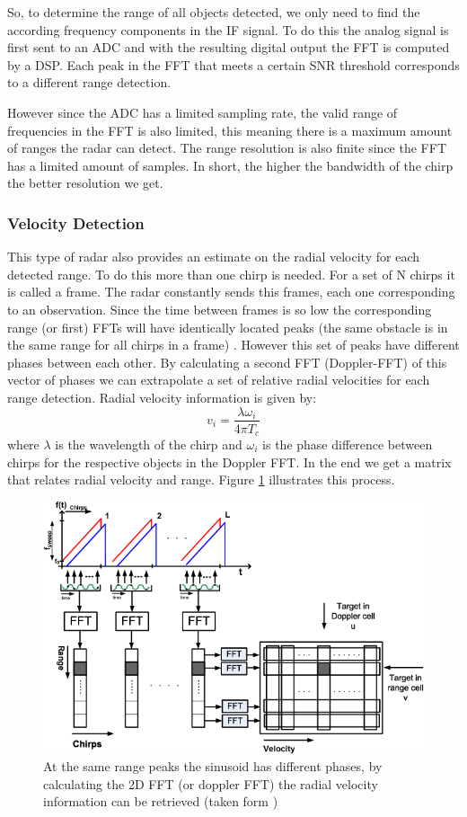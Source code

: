  So, to determine the range of all objects detected, we only need to find the according frequency components in the \ac{IF} signal. To do this the analog signal is first sent to an \ac{ADC} and with the resulting digital output the \ac{FFT} is computed by a \ac{DSP}. Each peak in the \ac{FFT} that meets a certain \ac{SNR} threshold corresponds to a different range detection. 
 
 However since the \ac{ADC} has a limited sampling rate, the valid range of frequencies in the \ac{FFT} is also limited, this meaning there is a maximum amount of ranges the radar can detect.
The range resolution is also finite since the \ac{FFT} has a limited amount of samples. In short, the higher the bandwidth of the chirp the better resolution we get.


\subsubsection{Velocity Detection}
This type of radar also provides an estimate on the radial velocity for each detected range. To do this more than one chirp is needed. For a set of N chirps it is called a frame. The radar constantly sends this frames, each one corresponding to an observation. Since the time between frames is so low the corresponding range (or first) \ac{FFT}s will have  identically located peaks (the same obstacle is in the same range for all chirps in a frame) . However this set of peaks have different phases between each other. By calculating a second \ac{FFT} (Doppler-FFT) of this vector of phases we can extrapolate a set of relative radial velocities  for each range detection. Radial velocity information is given by:
\begin{equation}
    v_i=\frac{\lambda \omega_i}{4 \pi T_c}
    \label{eq:2}
\end{equation}
where $\lambda$ is the wavelength of the chirp and $\omega_i$ is the phase difference between chirps for the respective objects in the Doppler FFT.
In the end we get a matrix that relates radial velocity and range. 
Figure \ref{fig:matrix} illustrates this process.
\begin{figure}[ht] 
\centerline{\includegraphics [width=0.8 \textwidth]{imgs/chapter2/dopplerFFT2.png}}
\caption[2D FFT for retrieving velocity information]{At the same range peaks the sinusoid has different phases, by calculating the 2D FFT (or doppler FFT) the radial velocity information can be retrieved (taken form \cite{schroeder2010x})}
\label{fig:matrix}
\end{figure}

